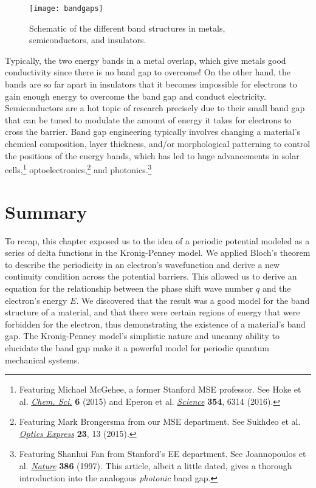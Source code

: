 \begin{figure}[!h]
	\centering
	\texttt{[image: bandgaps]}
	\caption{Schematic of the different band structures in metals, semiconductors, and insulators.}
	\label{fig:bgs}
\end{figure}

Typically, the two energy bands in a metal overlap, which give metals good conductivity since there is no band gap to overcome! On the other hand, the bands are so far apart in insulators that it becomes impossible for electrons to gain enough energy to overcome the band gap and conduct electricity. Semiconductors are a hot topic of research precisely due to their small band gap that can be tuned to modulate the amount of energy it takes for electrons to cross the barrier. Band gap engineering typically involves changing a material's chemical composition, layer thickness, and/or morphological patterning to control the positions of the energy bands, which has led to huge advancements in solar cells,\footnote{Featuring Michael McGehee, a former Stanford MSE professor. See Hoke et al. \href{http://pubs.rsc.org/-/content/articlehtml/2015/sc/c4sc03141e}{\emph{Chem. Sci.}} \textbf{6} (2015) and Eperon et al. \href{http://science.sciencemag.org/content/354/6314/861.full}{\emph{Science}} \textbf{354}, 6314 (2016).} optoelectronics,\footnote{Featuring Mark Brongersma from our MSE department. See Sukhdeo et al. \href{https://www.osapublishing.org/oe/abstract.cfm?uri=oe-23-13-16740}{\emph{Optics Express}} \textbf{23}, 13 (2015).} and photonics.\footnote{Featuring Shanhui Fan from Stanford's EE department. See Joannopoulos et al. \href{https://www.nature.com/nature/journal/v386/n6621/pdf/386143a0.pdf}{\emph{Nature}} \textbf{386} (1997). This article, albeit a little dated, gives a thorough introduction into the analogous \emph{photonic} band gap.}


\section{Summary}
To recap, this chapter exposed us to the idea of a periodic potential modeled as a series of delta functions in the Kronig-Penney model. We applied Bloch's theorem to describe the periodicity in an electron's wavefunction and derive a new continuity condition across the potential barriers. This allowed us to derive an equation for the relationship between the phase shift wave number $q$ and the electron's energy $E$. We discovered that the result was a good model for the band structure of a material, and that there were certain regions of energy that were forbidden for the electron, thus demonstrating the existence of a material's band gap. The Kronig-Penney model's simplistic nature and uncanny ability to elucidate the band gap make it a powerful model for periodic quantum mechanical systems. \par 

